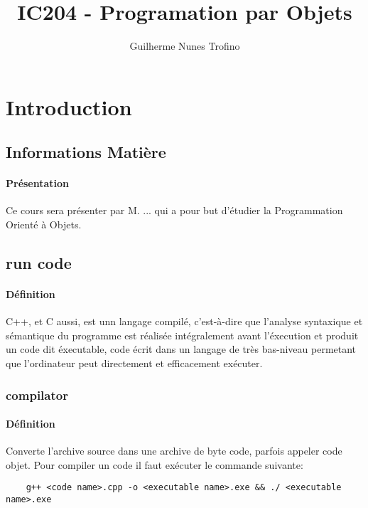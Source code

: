 \documentclass{article}
\title{IC204 - Programation par Objets}
\author{Guilherme Nunes Trofino}
\begin{document}
\maketitle

\newpage\tableofcontents

\section{Introduction}



\subsection{Informations Matière}
\paragraph{Présentation}Ce cours sera présenter par M. ... qui a pour but d'étudier la Programmation Orienté à Objets.

\subsection{run code}
\paragraph{Définition}C++, et C aussi, est unn langage compilé, c'est-à-dire que l'analyse syntaxique et sémantique du programme est réalisée intégralement avant l'éxecution et produit un code dit éxecutable, code écrit dans un langage de très bas-niveau permetant que l'ordinateur peut directement et efficacement exécuter.\\

\subsubsection{compilator}
\paragraph{Définition}Converte l'archive source dans une archive de byte code, parfois appeler code objet. Pour compiler un code il faut exécuter le commande suivante:
\begin{scriptsize}
    \myStyleCPP
    \begin{lstlisting}
    g++ <code name>.cpp -o <executable name>.exe && ./ <executable name>.exe
    \end{lstlisting}
\end{scriptsize}
\end{document}
